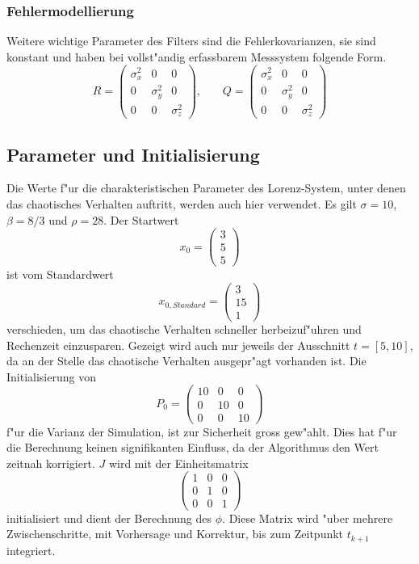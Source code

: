 \begin{refsection}
\subsubsection{Fehlermodellierung}
Weitere wichtige Parameter des Filters sind die Fehlerkovarianzen, sie sind konstant und haben bei vollst"andig erfassbarem Messsystem folgende Form.
\[R=\begin{pmatrix}
\sigma^{2}_{x} & 0 & 0 \\ 
0 & \sigma^{2}_{y} & 0 \\ 
0 & 0 & \sigma^{2}_{z}
\end{pmatrix}  \text{,}\qquad
Q=\begin{pmatrix}
\sigma^{2}_{x} & 0 & 0 \\ 
0 & \sigma^{2}_{y} & 0 \\ 
0 & 0 & \sigma^{2}_{z}
\end{pmatrix} 
\]

\subsection{Parameter und Initialisierung}
Die Werte f"ur die charakteristischen Parameter des Lorenz-System, unter denen das chaotisches Verhalten auftritt, werden auch hier verwendet. Es gilt $\sigma=10$, $\beta=8/3$ und $\rho=28$. Der Startwert
\[
x_{0}=\begin{pmatrix}
3 \\ 
5 \\ 
5
\end{pmatrix}
\]
ist vom Standardwert
\[
x_{0,Standard}=
\begin{pmatrix}
3\\
15\\
1
\end{pmatrix}\]
verschieden, um das chaotische Verhalten schneller herbeizuf"uhren und Rechenzeit einzusparen. Gezeigt wird auch nur jeweils der Ausschnitt $t = [5,10]$, da an der Stelle das chaotische Verhalten ausgepr"agt vorhanden ist. 
Die Initialisierung von
\[
P_{0}=\begin{pmatrix}
10 & 0 & 0 \\ 
0 & 10 & 0 \\ 
0 & 0 & 10
\end{pmatrix}
\]
f"ur die Varianz der Simulation, ist zur Sicherheit gross gew"ahlt. Dies hat f"ur die Berechnung keinen signifikanten Einfluss, da der Algorithmus den Wert zeitnah korrigiert. $J$ wird mit der Einheitsmatrix
\[
\begin{pmatrix}
1 & 0 & 0 \\ 
0 & 1 & 0 \\ 
0 & 0 & 1
\end{pmatrix} 
\]
initialisiert und dient der Berechnung des $\phi$. Diese Matrix wird "uber mehrere Zwischenschritte, mit Vorhersage und Korrektur, bis zum Zeitpunkt $t_{k+1}$ integriert.


\end{refsection}
